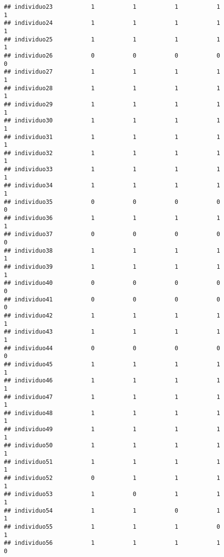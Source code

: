 \documentclass[
]{article}
\begin{document}
\begin{verbatim}
## individuo23           1           1           1           1           1
## individuo24           1           1           1           1           1
## individuo25           1           1           1           1           1
## individuo26           0           0           0           0           0
## individuo27           1           1           1           1           1
## individuo28           1           1           1           1           1
## individuo29           1           1           1           1           1
## individuo30           1           1           1           1           1
## individuo31           1           1           1           1           1
## individuo32           1           1           1           1           1
## individuo33           1           1           1           1           1
## individuo34           1           1           1           1           1
## individuo35           0           0           0           0           0
## individuo36           1           1           1           1           1
## individuo37           0           0           0           0           0
## individuo38           1           1           1           1           1
## individuo39           1           1           1           1           1
## individuo40           0           0           0           0           0
## individuo41           0           0           0           0           0
## individuo42           1           1           1           1           1
## individuo43           1           1           1           1           1
## individuo44           0           0           0           0           0
## individuo45           1           1           1           1           1
## individuo46           1           1           1           1           1
## individuo47           1           1           1           1           1
## individuo48           1           1           1           1           1
## individuo49           1           1           1           1           1
## individuo50           1           1           1           1           1
## individuo51           1           1           1           1           1
## individuo52           0           1           1           1           1
## individuo53           1           0           1           1           1
## individuo54           1           1           0           1           1
## individuo55           1           1           1           0           1
## individuo56           1           1           1           1           0
\end{verbatim}
\end{document}
